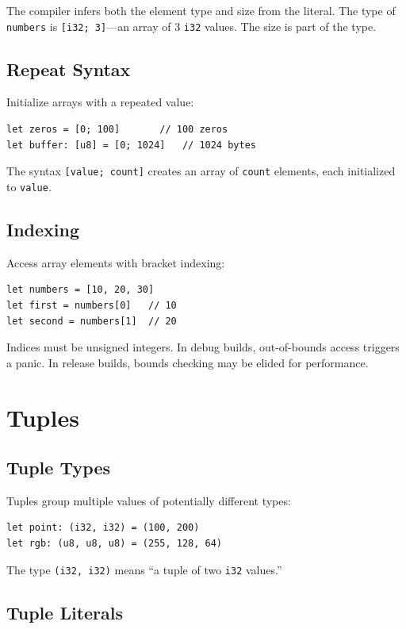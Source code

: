 The compiler infers both the element type and size from the literal. The type of \texttt{numbers} is \texttt{[i32; 3]}---an array of 3 \texttt{i32} values. The size is part of the type.

\subsection{Repeat Syntax}

Initialize arrays with a repeated value:

\begin{lstlisting}
let zeros = [0; 100]       // 100 zeros
let buffer: [u8] = [0; 1024]   // 1024 bytes
\end{lstlisting}

The syntax \texttt{[value; count]} creates an array of \texttt{count} elements, each initialized to \texttt{value}.

\subsection{Indexing}

Access array elements with bracket indexing:

\begin{lstlisting}
let numbers = [10, 20, 30]
let first = numbers[0]   // 10
let second = numbers[1]  // 20
\end{lstlisting}

Indices must be unsigned integers. In debug builds, out-of-bounds access triggers a panic. In release builds, bounds checking may be elided for performance.

\section{Tuples}

\subsection{Tuple Types}

Tuples group multiple values of potentially different types:

\begin{lstlisting}
let point: (i32, i32) = (100, 200)
let rgb: (u8, u8, u8) = (255, 128, 64)
\end{lstlisting}

The type \texttt{(i32, i32)} means ``a tuple of two \texttt{i32} values.''

\subsection{Tuple Literals}

